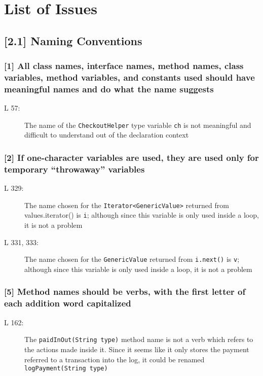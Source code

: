 \section{List of Issues}
\subsection*{[2.1] Naming Conventions}
\subsubsection*{[1] All class names, interface names, method names, class variables, method variables, and constants used should have meaningful names and do what the name suggests}
\begin{description}
	\item[L 57:] The name of the {\tt CheckoutHelper} type variable {\tt ch} is not meaningful and difficult to understand out of the declaration context
\end{description}

\subsubsection*{[2] If one-character variables are used, they are used only for temporary “throwaway” variables}
\begin{description}
	\item[L 329:] The name chosen for the {\tt Iterator<GenericValue>} returned from {values.iterator()} is {\tt i}; although since this variable is only used inside a loop, it is not a problem
	\item[L 331, 333:] The name chosen for the {\tt GenericValue} returned from {\tt i.next()} is {\tt v}; although since this variable is only used inside a loop, it is not a problem
\end{description}

\subsubsection*{[5] Method names should be verbs, with the first letter of each addition word capitalized}
\begin{description}
	\item[L 162:] The {\tt paidInOut(String type)} method name is not a verb which refers to the actions made inside it. Since it seems like it only stores the payment referred to a transaction into the log, it could be renamed {\tt logPayment(String type)}
\end{description}

